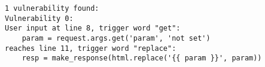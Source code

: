 \begin{lstlisting}[style=default, caption={An example of how the vulnerability log looks after it found one vulnerability.}, label={vulnerability_log_example}]
1 vulnerability found:
Vulnerability 0:
User input at line 8, trigger word "get": 
    param = request.args.get('param', 'not set')
reaches line 11, trigger word "replace": 
    resp = make_response(html.replace('{{ param }}', param))
\end{lstlisting}
